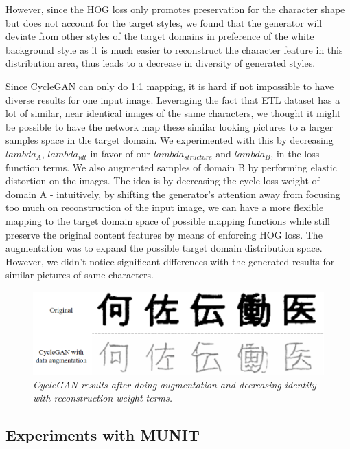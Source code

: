 \documentclass[12pt]{report}
\begin{document}
However, since the HOG loss only promotes preservation for the character shape but does not account for the target styles, we found that the generator will deviate from other styles of the target domains in preference of the white background style as it is much easier to reconstruct the character feature in this distribution area, thus leads to a decrease in diversity of generated styles.
 
Since CycleGAN can only do 1:1 mapping, it is hard if not impossible to have diverse results for one input image. Leveraging the fact that ETL dataset has a lot of similar, near identical images of the same characters, we thought it might be possible to have the network map these similar looking pictures to a larger samples space in the target domain. We experimented with this by decreasing $lambda_A$, $lambda_{idt}$ in favor of our $lambda_{structure}$ and $lambda_B$, in the loss function terms. We also augmented samples of domain B by performing elastic distortion on the images. The idea is by decreasing the cycle loss weight of domain A - intuitively, by shifting the generator's attention away from focusing too much on reconstruction of the input image, we can have a more flexible mapping to the target domain space of possible mapping functions while still preserve the original content features by means of enforcing HOG loss. The augmentation was to expand the possible target domain distribution space. However, we didn't notice significant differences with the generated results for similar pictures of same characters.

\begin{figure}[h]
	\centering
	\includegraphics[scale=0.6]{augment-example}
	\caption{\textit{CycleGAN results after doing augmentation and decreasing identity with reconstruction weight terms.}}
	\label{fig:augment-example}
\end{figure}

\subsection{Experiments with MUNIT}
\end{document}
